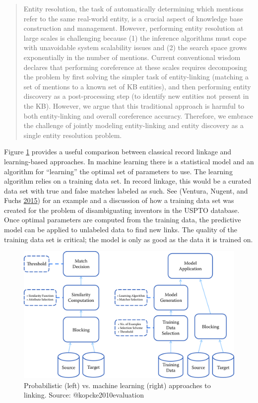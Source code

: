 \documentclass[]{krantz}
\begin{document}
\begin{quote}
Entity resolution, the task of automatically determining which mentions
refer to the same real-world entity, is a crucial aspect of knowledge
base construction and management. However, performing entity resolution
at large scales is challenging because (1) the inference algorithms must
cope with unavoidable system scalability issues and (2) the search space
grows exponentially in the number of mentions. Current conventional
wisdom declares that performing coreference at these scales requires
decomposing the problem by first solving the simpler task of
entity-linking (matching a set of mentions to a known set of KB
entities), and then performing entity discovery as a post-processing
step (to identify new entities not present in the KB). However, we argue
that this traditional approach is harmful to both entity-linking and
overall coreference accuracy. Therefore, we embrace the challenge of
jointly modeling entity-linking and entity discovery as a single entity
resolution problem.
\end{quote}

Figure \ref{fig:fig3-2} provides a useful comparison between classical
record linkage and learning-based approaches. In machine learning there
is a statistical model and an algorithm for ``learning'' the optimal set
of parameters to use. The learning algorithm relies on a training data
set. In record linkage, this would be a curated data set with true and
false matches labeled as such. See (Ventura, Nugent, and Fuchs
\protect\hyperlink{ref-ventura2015seeing}{2015}) for an example and a
discussion of how a training data set was created for the problem of
disambiguating inventors in the USPTO database. Once optimal parameters
are computed from the training data, the predictive model can be applied
to unlabeled data to find new links. The quality of the training data
set is critical; the model is only as good as the data it is trained on.

\begin{figure}

{\centering \includegraphics[width=0.7\linewidth]{ChapterLinkage/figures/fig3-2} 

}

\caption{Probabilistic (left) vs. machine learning (right) approaches to linking. Source: @kopcke2010evaluation}\label{fig:fig3-2}
\end{figure}
\end{document}
